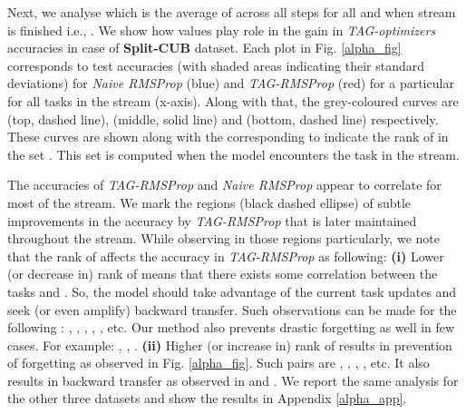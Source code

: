 \documentclass{article} \usepackage{collas2022_conference,times}
\begin{document}
    Next, we analyse  which is the average of  across all steps  for all  and  when stream is finished i.e., . We show how  values play role in the gain in \textit{TAG-optimizers} accuracies in case of \textbf{Split-CUB} dataset. Each plot in Fig. \ref{alpha_fig} corresponds to test accuracies  (with shaded areas indicating their standard deviations) for \textit{Naive RMSProp} (blue) and \textit{TAG-RMSProp} (red) for a particular  for all tasks  in the stream (x-axis). Along with that, the grey-coloured curves are  (top, dashed line),  (middle, solid line) and  (bottom, dashed line) respectively. { These curves are shown along with the corresponding  to indicate the rank of  in the set . This set is computed when the model encounters the task  in the stream.}

    The accuracies of \textit{TAG-RMSProp} and \textit{Naive RMSProp} appear to correlate for most of the stream. We mark the regions (black dashed ellipse) of subtle improvements in the accuracy by \textit{TAG-RMSProp} that is later maintained throughout the stream. While observing  in those regions particularly, we note that the rank of  affects the accuracy in \textit{TAG-RMSProp} as following: \textbf{(i)} Lower (or decrease in) rank of  means that there exists some correlation between the tasks  and . So, the model should take advantage of the current task updates and seek (or even amplify) backward transfer. Such observations can be made for the following : , , , , ,  etc. Our method also prevents drastic forgetting as well in few cases. For example: , , . \textbf{(ii)} Higher (or increase in) rank of  results in prevention of forgetting as observed in Fig. \ref{alpha_fig}. Such  pairs are , , , , etc. It also results in backward transfer as observed in  and . We report the same analysis for the other three datasets and show the results in Appendix \ref{alpha_app}. 
\end{document}
